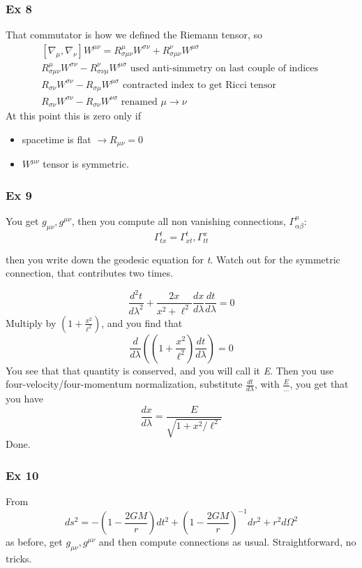 \subsubsection{Ex 8}
That commutator is how we defined the Riemann tensor, so
\begin{gather*}
\left[ \nabla _{\mu }, \nabla _{\nu } \right]W^{\mu \nu } = R^{\mu }_{\sigma \mu \nu }W^{\sigma \nu } + R^{\nu }_{\sigma \mu \nu }W^{\mu \sigma }\\
R^{\mu }_{\sigma \mu \nu }W^{\sigma \nu } - R^{\nu }_{\sigma \nu \mu }W^{\mu \sigma } \text{ used anti-simmetry on last couple of indices }\\
R_{\sigma \nu }W^{\sigma \nu } - R_{\sigma \mu }W^{\mu \sigma } \text{ contracted index to get Ricci tensor }\\
R_{\sigma \nu }W^{\sigma \nu } - R_{\sigma \nu }W^{\nu \sigma } \text{ renamed $\mu\to \nu  $ }
\end{gather*}
At this point this is zero only if 
\begin{itemize}
\item  spacetime is flat $\to R_{\mu \nu }=0$
\item $W^{\mu \nu }$ tensor is symmetric.
\end{itemize}

\subsubsection{Ex 9}
You get $g_{\mu \nu }, g^{\mu \nu }$, then you compute all non vanishing connections, $\Gamma ^{\mu }_{\alpha \beta }$:
\[
\Gamma ^{t}_{tx }= \Gamma ^{t}_{xt}, \Gamma ^{x}_{tt}
\]

then you write down the geodesic equation for \emph{t}. Watch out for the symmetric connection, that contributes two times. \par
\[
	\frac{d ^{2}t}{d \lambda ^{2} } + \frac{2x}{x^{2}+\ell^{2}}\frac{d x}{d \lambda }\frac{d t}{d \lambda } = 0
\]
Multiply by $\left( 1 + \frac{x^{2}}{\ell^{2}} \right)$, and you find that
\[
\frac{d }{d \lambda }\left( \left(  1+ \frac{x^{2}}{\ell^{2}} \right) \frac{d t}{d \lambda } \right) = 0
\]
You see that that quantity is conserved, and you will call it \emph{E}. Then you use four-velocity/four-momentum normalization, substitute $\frac{d t}{d \lambda }$, with $\frac{E}{\ldots }$, you get that you have 
\[
\frac{d x}{d \lambda } = \frac{E}{\sqrt{1 + x^{2}/\ell^{2}}}
\]
Done.
\subsubsection{Ex 10}
From 
\[
ds^{2 } = -\left( 1- \frac{2GM}{r} \right)dt^{2} + \left( 1 - \frac{2GM}{r} \right)^{-1}dr^{2} + r^{2}d\Omega ^{2}
\]
as before, get $g_{\mu \nu }, g^{\mu \nu }$ and then compute connections as usual. Straightforward, no tricks.

